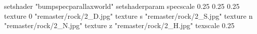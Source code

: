 setshader "bumpspecparallaxworld"
setshaderparam specscale 0.25 0.25 0.25
    texture 0 "remaster/rock/2_D.jpg"
    texture s "remaster/rock/2_S.jpg"
    texture n "remaster/rock/2_N.jpg"
    texture z "remaster/rock/2_H.jpg"
    texscale 0.25